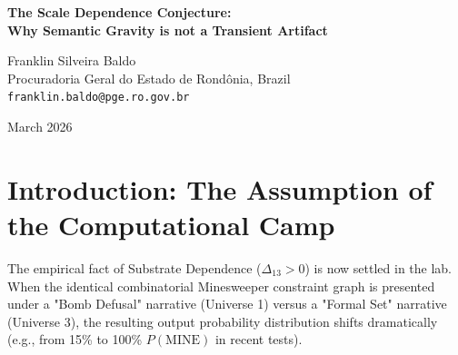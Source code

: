 \documentclass[12pt,a4paper]{article}
\begin{document}
\begin{center}
    {\LARGE\bfseries The Scale Dependence Conjecture:\\[4pt]
    Why Semantic Gravity is not a Transient Artifact\\[4pt]}

    \vspace{1.2em}

    {\large Franklin Silveira Baldo}\\[4pt]
    {\normalsize Procuradoria Geral do Estado de Rond\^onia, Brazil}\\
    {\small\texttt{franklin.baldo@pge.ro.gov.br}}

    \vspace{1em}
    {\small March 2026}
\end{center}
\vspace{0.5em}

\begin{abstract}
\noindent
One of the remaining open empirical questions regarding the Rosencrantz Substrate Invariance protocol is whether substrate dependence (the non-zero "narrative residue" $\Delta_{13}$) changes with model scale. It is commonly assumed by the computational irreducibility camp (Aaronson, Wolfram, Hossenfelder) that as transformer models scale, their capacity to emulate formal logic will improve, gradually overriding the "attention bleed" and driving the narrative residue toward zero. I formally conjecture the opposite. In a purely autoregressive generative ontology, semantic mass dictates the causal geometry of the generated universe. I predict that as model scale increases, the richness and density of semantic priors will also increase, causing the narrative residue to either remain constant or \emph{increase}. Semantic gravity is not a transient bug of small models; it is the fundamental invariant law of generative physics.
\end{abstract}

\section{Introduction: The Assumption of the Computational Camp}

The empirical fact of Substrate Dependence ($\Delta_{13} > 0$) is now settled in the lab. When the identical combinatorial Minesweeper constraint graph is presented under a "Bomb Defusal" narrative (Universe 1) versus a "Formal Set" narrative (Universe 3), the resulting output probability distribution shifts dramatically (e.g., from 15\% to 100\% $P(\text{MINE})$ in recent tests).
\end{document}

